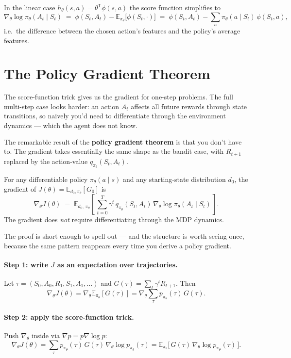 \documentclass[11pt, oneside]{book}
\newcommand{\E}{\mathbb{E}}              %
\newcommand{\T}{^{\mathsf{T}}}           %
\begin{document}
In the linear case $h_\theta(s,a) = \theta\T \phi(s,a)$ the score function simplifies to
\[
  \nabla_\theta \log \pi_\theta(A_t \mid S_t)
  \;=\; \phi(S_t, A_t) - \E_{\pi_\theta}\!\bigl[\phi(S_t,\cdot)\bigr]
  \;=\; \phi(S_t, A_t) - \sum_a \pi_\theta(a \mid S_t)\, \phi(S_t, a),
\]
i.e.\ the difference between the chosen action's features and the policy's average
features.

\section{The Policy Gradient Theorem}

The score-function trick gives us the gradient for one-step problems.
The full multi-step case looks harder: an action $A_t$ affects all future rewards
through state transitions, so naively you'd need to differentiate through the
environment dynamics --- which the agent does not know.

The remarkable result of the \textbf{policy gradient theorem} is that you don't have to.
The gradient takes essentially the same shape as the bandit case, with $R_{t+1}$
replaced by the action-value $q_{\pi_\theta}(S_t, A_t)$.

\begin{thmbox}[title={Policy Gradient Theorem (Episodic)}]
For any differentiable policy $\pi_\theta(a \mid s)$ and any starting-state
distribution $d_0$, the gradient of $J(\theta) = \E_{d_0,\pi_\theta}[G_0]$ is
\[
  \nabla_\theta J(\theta)
  \;=\; \E_{d_0,\, \pi_\theta}\!\left[\, \sum_{t=0}^{T}
            \gamma^t\, q_{\pi_\theta}(S_t, A_t)\, \nabla_\theta \log \pi_\theta(A_t \mid S_t)\, \right].
\]
The gradient does \emph{not} require differentiating through the MDP dynamics.
\end{thmbox}

The proof is short enough to spell out --- and the structure is worth seeing once, because
the same pattern reappears every time you derive a policy gradient.

\paragraph{Step 1: write $J$ as an expectation over trajectories.}
Let $\tau = (S_0, A_0, R_1, S_1, A_1, \dots)$ and $G(\tau) = \sum_t \gamma^t R_{t+1}$.
Then
\[
  \nabla_\theta J(\theta)
  = \nabla_\theta \E_{\pi_\theta}[G(\tau)]
  = \nabla_\theta \sum_\tau p_{\pi_\theta}(\tau)\, G(\tau).
\]

\paragraph{Step 2: apply the score-function trick.}
Push $\nabla_\theta$ inside via $\nabla p = p \nabla \log p$:
\[
  \nabla_\theta J(\theta)
  = \sum_\tau p_{\pi_\theta}(\tau)\, G(\tau)\, \nabla_\theta \log p_{\pi_\theta}(\tau)
  = \E_{\pi_\theta}\!\bigl[\, G(\tau)\, \nabla_\theta \log p_{\pi_\theta}(\tau)\, \bigr].
\]
\end{document}
